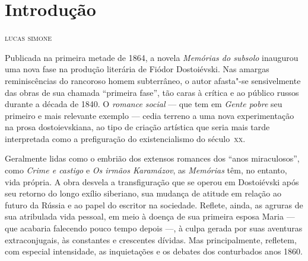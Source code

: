 \pagestyle{plain}

\chapter*{Introdução\smallskip{}}

\begin{flushright}
\textsc{lucas simone}
\end{flushright}

\noindent{}Publicada na primeira metade de 1864, a novela \textit{Memórias do subsolo}
inaugurou uma nova fase na produção literária de Fiódor Dostoiévski. Nas
amargas reminiscências do rancoroso homem subterrâneo, o autor afasta"-se
sensivelmente das obras de sua chamada ``primeira fase'', tão caras à crítica e
ao público russos durante a década de 1840. O \textit{romance social} --- que tem em
\textit{Gente pobre} seu primeiro e mais relevante exemplo --- cedia terreno a
uma nova experimentação na prosa dostoievskiana, ao tipo de criação artística
que seria mais tarde interpretada como a prefiguração do existencialismo do
século~\textsc{xx}.

Geralmente lidas como o embrião dos extensos romances dos ``anos miraculosos'',
como \textit{Crime e castigo} e \textit{Os irmãos Karamázov}, as
\textit{Memórias} têm, no entanto, vida própria. A obra desvela a
transfiguração que se operou em Dostoiévski após seu retorno do longo exílio
siberiano, sua mudança de atitude em relação ao futuro da Rússia e ao papel do
escritor na sociedade.  Reflete, ainda, as agruras de sua atribulada vida
pessoal, em meio à doença de sua primeira esposa Maria --- que acabaria falecendo
pouco tempo depois ---, à culpa gerada por suas aventuras extraconjugais, às
constantes e crescentes dívidas. Mas principalmente, refletem, com especial
intensidade, as inquietações e os debates dos conturbados anos 1860.

